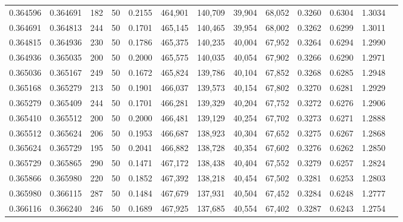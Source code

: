 \begin{tabular}{rrrrrrrrrrrrr}
0.364596 & 0.364691 &   182 &  50 &                                     0.2155 & 464,901 & 140,709 &  39,904 &  68,052 & 0.3260 & 0.6304 & 1.3034 \\
0.364691 & 0.364813 &   244 &  50 &                                     0.1701 & 465,145 & 140,465 &  39,954 &  68,002 & 0.3262 & 0.6299 & 1.3011 \\
0.364815 & 0.364936 &   230 &  50 &                                     0.1786 & 465,375 & 140,235 &  40,004 &  67,952 & 0.3264 & 0.6294 & 1.2990 \\
0.364936 & 0.365035 &   200 &  50 &                                     0.2000 & 465,575 & 140,035 &  40,054 &  67,902 & 0.3266 & 0.6290 & 1.2971 \\
0.365036 & 0.365167 &   249 &  50 &                                     0.1672 & 465,824 & 139,786 &  40,104 &  67,852 & 0.3268 & 0.6285 & 1.2948 \\
0.365168 & 0.365279 &   213 &  50 &                                     0.1901 & 466,037 & 139,573 &  40,154 &  67,802 & 0.3270 & 0.6281 & 1.2929 \\
0.365279 & 0.365409 &   244 &  50 &                                     0.1701 & 466,281 & 139,329 &  40,204 &  67,752 & 0.3272 & 0.6276 & 1.2906 \\
0.365410 & 0.365512 &   200 &  50 &                                     0.2000 & 466,481 & 139,129 &  40,254 &  67,702 & 0.3273 & 0.6271 & 1.2888 \\
0.365512 & 0.365624 &   206 &  50 &                                     0.1953 & 466,687 & 138,923 &  40,304 &  67,652 & 0.3275 & 0.6267 & 1.2868 \\
0.365624 & 0.365729 &   195 &  50 &                                     0.2041 & 466,882 & 138,728 &  40,354 &  67,602 & 0.3276 & 0.6262 & 1.2850 \\
0.365729 & 0.365865 &   290 &  50 &                                     0.1471 & 467,172 & 138,438 &  40,404 &  67,552 & 0.3279 & 0.6257 & 1.2824 \\
0.365866 & 0.365980 &   220 &  50 &                                     0.1852 & 467,392 & 138,218 &  40,454 &  67,502 & 0.3281 & 0.6253 & 1.2803 \\
0.365980 & 0.366115 &   287 &  50 &                                     0.1484 & 467,679 & 137,931 &  40,504 &  67,452 & 0.3284 & 0.6248 & 1.2777 \\
0.366116 & 0.366240 &   246 &  50 &                                     0.1689 & 467,925 & 137,685 &  40,554 &  67,402 & 0.3287 & 0.6243 & 1.2754 \\

\end{tabular}
